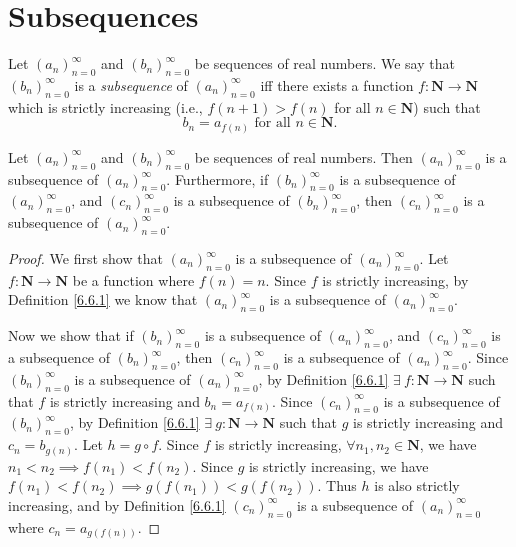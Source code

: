 \section{Subsequences}\label{sec 6.6}

\begin{definition}[Subsequences]\label{6.6.1}
    Let \((a_n)_{n = 0}^\infty\) and \((b_n)_{n = 0}^\infty\) be sequences of real numbers.
    We say that \((b_n)_{n = 0}^\infty\) is a \emph{subsequence} of \((a_n)_{n = 0}^\infty\) iff there exists a function \(f : \mathbf{N} \to \mathbf{N}\) which is strictly increasing (i.e., \(f(n + 1) > f(n)\) for all \(n \in \mathbf{N}\)) such that
    \[
        b_n = a_{f(n)} \text{ for all } n \in \mathbf{N}.
    \]
\end{definition}

\setcounter{theorem}{3}
\begin{lemma}\label{6.6.4}
    Let \((a_n)_{n = 0}^\infty\) and \((b_n)_{n = 0}^\infty\) be sequences of real numbers.
    Then \((a_n)_{n = 0}^\infty\) is a subsequence of \((a_n)_{n = 0}^\infty\).
    Furthermore, if \((b_n)_{n = 0}^\infty\) is a subsequence of \((a_n)_{n = 0}^\infty\), and \((c_n)_{n = 0}^\infty\) is a subsequence of \((b_n)_{n = 0}^\infty\), then \((c_n)_{n = 0}^\infty\) is a subsequence of \((a_n)_{n = 0}^\infty\).
\end{lemma}

\begin{proof}
    We first show that \((a_n)_{n = 0}^\infty\) is a subsequence of \((a_n)_{n = 0}^\infty\).
    Let \(f : \mathbf{N} \to \mathbf{N}\) be a function where \(f(n) = n\).
    Since \(f\) is strictly increasing, by Definition \ref{6.6.1} we know that \((a_n)_{n = 0}^\infty\) is a subsequence of \((a_n)_{n = 0}^\infty\).

    Now we show that if \((b_n)_{n = 0}^\infty\) is a subsequence of \((a_n)_{n = 0}^\infty\), and \((c_n)_{n = 0}^\infty\) is a subsequence of \((b_n)_{n = 0}^\infty\), then \((c_n)_{n = 0}^\infty\) is a subsequence of \((a_n)_{n = 0}^\infty\).
    Since \((b_n)_{n = 0}^\infty\) is a subsequence of \((a_n)_{n = 0}^\infty\), by Definition \ref{6.6.1} \(\exists\ f : \mathbf{N} \to \mathbf{N}\) such that \(f\) is strictly increasing and \(b_n = a_{f(n)}\).
    Since \((c_n)_{n = 0}^\infty\) is a subsequence of \((b_n)_{n = 0}^\infty\), by Definition \ref{6.6.1} \(\exists\ g : \mathbf{N} \to \mathbf{N}\) such that \(g\) is strictly increasing and \(c_n = b_{g(n)}\).
    Let \(h = g \circ f\).
    Since \(f\) is strictly increasing, \(\forall n_1, n_2 \in \mathbf{N}\), we have \(n_1 < n_2 \implies f(n_1) < f(n_2)\).
    Since \(g\) is strictly increasing, we have \(f(n_1) < f(n_2) \implies g(f(n_1)) < g(f(n_2))\).
    Thus \(h\) is also strictly increasing, and by Definition \ref{6.6.1} \((c_n)_{n = 0}^\infty\) is a subsequence of \((a_n)_{n = 0}^\infty\) where \(c_n = a_{g(f(n))}\).
\end{proof}

